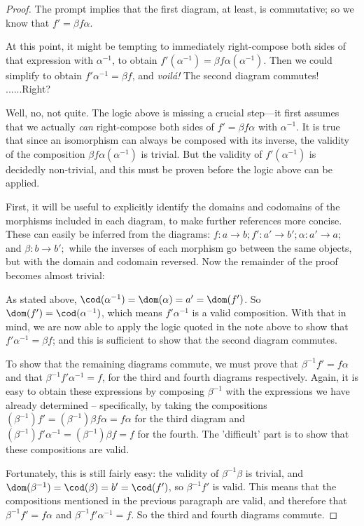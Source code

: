 \documentclass[main.tex]{subfiles}
\begin{document}
\begin{proof}
 The prompt implies that the first diagram, at least, is
commutative; so we know that \(f' = \beta f \alpha \).

	At this point, it might be tempting to immediately right-compose both sides
	of that expression with \(\alpha^{-1}\), to obtain \(f'(\alpha^{-1}) = \beta
	f \alpha(\alpha^{-1})\). Then we could simplify to obtain \(f' \alpha^{-1} =
	\beta f\), and \textit{voil\'{a}!} The second diagram commutes! ......Right?

	Well, no, not quite. The logic above is missing a crucial step---it first
	assumes that we actually \textit{can} right-compose both sides of \(f' =
	\beta f \alpha \) with \(\alpha^{-1}\). It is true that since an isomorphism
	can always be composed with its inverse, the validity of the composition
	\(\beta f \alpha (\alpha^{-1})\) is trivial. But the validity of \(f'
	(\alpha^{-1})\) is decidedly non-trivial, and this must be proven before the
	logic above can be applied.
	
First, it will be useful to explicitly identify the domains and codomains of the
morphisms included in each diagram, to make further references more concise.
These can easily be inferred from the diagrams: \(f \colon a \to b; f' \colon a'
\to b'; \alpha \colon a' \to a;\) and \(\beta \colon b \to b';\) while the
inverses of each morphism go between the same objects, but with the domain and
codomain reversed. Now the remainder of the proof becomes almost trivial:

As stated above, \(\cod(\alpha^{-1}) = \dom(\alpha) = a' = \dom (f')\). So
\(\dom(f') = \cod(\alpha^{-1})\), which means \(f' \alpha^{-1}\) is a valid
composition. With that in mind, we are now able to apply the logic quoted in the
note above to show that \(f' \alpha^{-1} = \beta f\); and this is sufficient to
show that the second diagram commutes.

To show that the remaining diagrams commute, we must prove that \(\beta^{-1} f'
= f \alpha\) and that \(\beta^{-1} f' \alpha^{-1} = f\), for the third and
fourth diagrams respectively. Again, it is easy to obtain these expressions by
composing \(\beta^{-1}\) with the expressions we have already determined --
specifically, by taking the compositions \((\beta^{-1})f' = (\beta^{-1})\beta f
\alpha = f \alpha\) for the third diagram and \((\beta^{-1})f' \alpha^{-1} =
(\beta^{-1})\beta f = f\) for the fourth. The 'difficult' part is to show that
these compositions are valid.

Fortunately, this is still fairly easy: the validity of \(\beta^{-1} \beta\) is
trivial, and \(\dom(\beta^{-1}) = \cod(\beta) = b' = \cod(f')\), so \(\beta^{-1}
f'\) is valid. This means that the compositions mentioned in the previous
paragraph are valid, and therefore that \(\beta^{-1} f' = f \alpha\) and
\(\beta^{-1} f' \alpha^{-1} = f\). So the third and fourth diagrams commute.
\end{proof}
\end{document}
